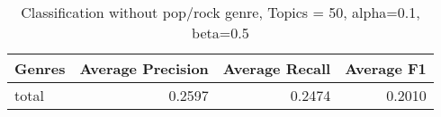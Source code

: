 \begin{table}[h!]
\begin{tabular}{|l|r|r|r|}

\hline
\textbf{Genres} &  \textbf{Average Precision} & \textbf{Average Recall} & \textbf{Average F1} \\
\hline
total & 0.2597 & 	0.2474 & 	0.2010\\
\hline
\end{tabular}
\caption{Classification without pop/rock genre, Topics = 50, alpha=0.1, beta=0.5}
\end{table}